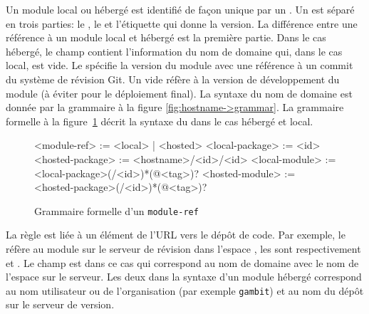 Un module local ou hébergé est identifié de façon unique par un
.  Un  est séparé en trois parties: le
, le  et l'étiquette qui donne la version.  La
différence entre une référence à un module local et hébergé est la première
partie. Dans le cas hébergé, le champ  contient l'information
du nom de domaine qui, dans le cas local, est vide.  Le 
spécifie la version du module avec une référence à un commit du système de
révision Git. Un  vide réfère à la version de développement du
module (à éviter pour le déploiement final).  La syntaxe du nom de domaine est
donnée par la grammaire à la figure \ref{fig:hostname->grammar}.  La grammaire
formelle à la figure~\ref{fig:module-ref->grammar} décrit la syntaxe du
 dans le cas hébergé et local.\\[1ex]

\begin{figure}[ht]
  \lstset{frame=single}
  \fontsize{12}{10}
  \begin{mplisting}{0.8}
<module-ref>       := <local> | <hosted>
<local-package>    := <id>
<hosted-package>   := <hostname>/<id>/<id>
<local-module>     := <local-package>(/<id>)*(@<tag>)?
<hosted-module>    := <hosted-package>(/<id>)*(@<tag>)?
\end{mplisting}
  \caption{Grammaire formelle d'un \texttt{module-ref}}
  \label{fig:module-ref->grammar}
\end{figure}

La règle  est liée à un élément de l'URL vers le dépôt de
code. Par exemple, le  
réfère au module  sur le serveur de révision
 dans l'espace , les  sont
respectivement  et . Le champ  est
dans ce cas  qui correspond au nom de domaine avec
le nom de l'espace sur le serveur. Les deux  dans la syntaxe
d'un module hébergé correspond au nom utilisateur ou de l'organisation (par
exemple \texttt{gambit}) et au nom du dépôt sur le serveur de version.


